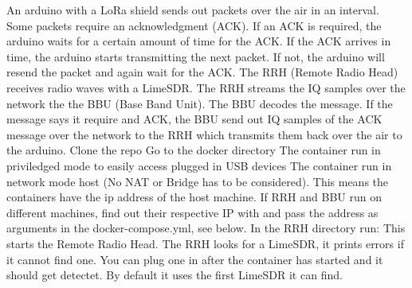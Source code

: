 \markdownRendererInterblockSeparator
{}An arduino with a LoRa shield sends out packets over the air in an interval. Some packets require an acknowledgment (ACK). If an ACK is required, the arduino waits for a certain amount of time for the ACK. If the ACK arrives in time, the arduino starts transmitting the next packet. If not, the arduino will resend the packet and again wait for the ACK.\markdownRendererInterblockSeparator
{}The RRH (Remote Radio Head) receives radio waves with a LimeSDR. The RRH streams the IQ samples over the network the the BBU (Base Band Unit).\markdownRendererInterblockSeparator
{}The BBU decodes the message. If the message says it require and ACK, the BBU send out IQ samples of the ACK message over the network to the RRH which transmits them back over the air to the arduino.\markdownRendererInterblockSeparator
{}\markdownRendererInterblockSeparator
{}\markdownRendererOlBeginTight
{}Clone the repo\markdownRendererOlItemEnd 
{}Go to the docker directory\markdownRendererOlItemEnd 
\markdownRendererOlEndTight \markdownRendererInterblockSeparator
{}\markdownRendererInterblockSeparator
{}\markdownRendererUlBeginTight
\markdownRendererUlItem The container run in priviledged mode to easily access plugged in USB devices\markdownRendererUlItemEnd 
\markdownRendererUlItem The container run in network mode host (No NAT or Bridge has to be considered). This means the containers have the ip address of the host machine. If RRH and BBU run on different machines, find out their respective IP with  and pass the address as arguments in the docker-compose.yml, see below.\markdownRendererUlItemEnd 
\markdownRendererUlEndTight \markdownRendererInterblockSeparator
{}\markdownRendererHorizontalRule{}\markdownRendererInterblockSeparator
{}\markdownRendererInterblockSeparator
{}In the RRH directory run:\markdownRendererInterblockSeparator
{}\markdownRendererInterblockSeparator
{}This starts the Remote Radio Head. The RRH looks for a LimeSDR, it prints errors if it cannot find one. You can plug one in after the container has started and it should get detectet. By default it uses the first LimeSDR it can find.\markdownRendererInterblockSeparator
{}\markdownRendererInterblockSeparator
